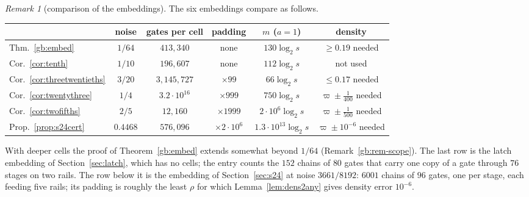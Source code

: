 \documentclass[11pt]{amsart}
\theoremstyle{definition}
\theoremstyle{remark}
\newtheorem{remark}[theorem]{Remark}
\begin{document}
\begin{remark}[comparison of the embeddings]
The six embeddings compare as follows.
\begin{center}
\begin{tabular}{lccccc}
\toprule
 & noise & gates per cell & padding & $m$ ($a=1$) & density\\
\midrule
Thm.~\ref{gb:embed} & $1/64$ & $413{,}340$ & none & $130\log_2s$ & $\ge0.19$ needed\\
Cor.~\ref{cor:tenth} & $1/10$ & $196{,}607$ & none & $112\log_2s$ & not used\\
Cor.~\ref{cor:threetwentieths} & $3/20$ & $3{,}145{,}727$ & $\times99$ & $66\log_2s$ & $\le0.17$ needed\\
Cor.~\ref{cor:twentythree} & $1/4$ & $3.2\cdot10^{16}$ & $\times999$ & $750\log_2s$ & $\varpi\pm\frac1{400}$ needed\\
Cor.~\ref{cor:twofifths} & $2/5$ & $12{,}160$ & $\times1999$ & $2\cdot10^6\log_2s$ & $\varpi\pm\frac1{500}$ needed\\
Prop.~\ref{prop:s24cert} & $0.4468$ & $576{,}096$ & $\times2\cdot10^6$ & $1.3\cdot10^{13}\log_2s$ & $\varpi\pm10^{-6}$ needed\\
\bottomrule
\end{tabular}
\end{center}
With deeper cells the proof of Theorem~\ref{gb:embed} extends somewhat beyond $1/64$
(Remark~\ref{gb:rem-scope}). The last row is the latch
embedding of Section~\ref{sec:latch}, which has no cells; the entry counts the $152$ chains of
$80$ gates that carry one copy of a gate through $76$ stages on two rails. The row below it is the
embedding of Section~\ref{sec:s24} at noise $3661/8192$: $6001$ chains of $96$ gates, one per
stage, each feeding five rails; its padding is roughly the least $\rho$ for which
Lemma~\ref{lem:dens2any} gives density error $10^{-6}$.
\end{remark}
\end{document}
